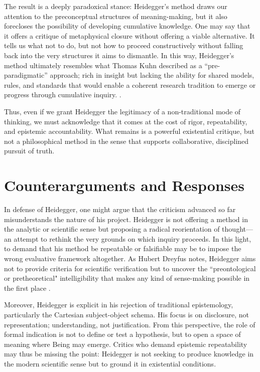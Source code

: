 \documentclass{article}
\begin{document}
The result is a deeply paradoxical stance: Heidegger's method draws our attention to the preconceptual structures of meaning-making, but it also forecloses the possibility of developing cumulative knowledge. One may say that it offers a critique of metaphysical closure without offering a viable alternative. It tells us what not to do, but not how to proceed constructively without falling back into the very structures it aims to dismantle. In this way, Heidegger’s method ultimately resembles what Thomas Kuhn described as a “pre-paradigmatic” approach; rich in insight but lacking the ability for shared models, rules, and standards that would enable a coherent research tradition to emerge or progress through cumulative inquiry. \parencite[pp.~10-11]{kuhn1996}.

Thus, even if we grant Heidegger the legitimacy of a non-traditional mode of thinking, we must acknowledge that it comes at the cost of rigor, repeatability, and epistemic accountability. What remains is a powerful existential critique, but not a philosophical method in the sense that supports collaborative, disciplined pursuit of truth.

\section*{Counterarguments and Responses}

In defense of Heidegger, one might argue that the criticism advanced so far misunderstands the nature of his project. Heidegger is not offering a method in the analytic or scientific sense but proposing a radical reorientation of thought—an attempt to rethink the very grounds on which inquiry proceeds. In this light, to demand that his method be repeatable or falsifiable may be to impose the wrong evaluative framework altogether. As Hubert Dreyfus notes, Heidegger aims not to provide criteria for scientific verification but to uncover the “preontological or pretheoretical" intelligibility that makes any kind of sense-making possible in the first place \parencite[pp.~19--23]{dreyfus1991}.

Moreover, Heidegger is explicit in his rejection of traditional epistemology, particularly the Cartesian subject-object schema. His focus is on disclosure, not representation; understanding, not justification. From this perspective, the role of formal indication is not to define or test a hypothesis, but to open a space of meaning where Being may emerge. Critics who demand epistemic repeatability may thus be missing the point: Heidegger is not seeking to produce knowledge in the modern scientific sense but to ground it in existential conditions.
\end{document}
